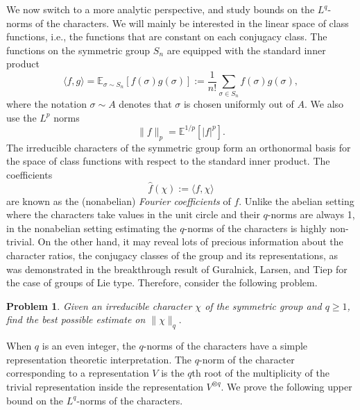 \documentclass[11pt, letterpaper]{amsart}
\newtheorem{problem}[thm]{Problem}
\newcommand{\remove}[1]{}
\renewcommand\ge{\geqslant}
\begin{document}
We now switch to a more analytic perspective, and study bounds on the $L^q$-norms of the characters. We will mainly be interested in the linear space of class functions, i.e., the functions that are constant on each conjugacy class. The functions on the symmetric group $S_n$ are equipped with the standard inner product 
\[\langle f, g \rangle =\mathbb{E}_{\sigma\sim S_n}[f(\sigma)g(\sigma)] := \frac{1}{n!}\sum_{\sigma \in S_n}f(\sigma)g(\sigma),\]
where the notation $\sigma \sim A$ denotes that $\sigma$ is chosen uniformly out of $A$.
We also use the $L^p$ norms 
\[\|f\|_p = \mathbb{E}^{1/p}[|f|^p].\]
The irreducible characters of the symmetric group form an orthonormal basis for the space of class functions with respect to the standard inner product. 
The coefficients 
\[
\hat{f}(\chi):= \langle f, \chi \rangle
\]
are known as the (nonabelian) \emph{Fourier coefficients} of $f$. Unlike the abelian setting where the characters take values in the unit circle and their $q$-norms are always 1, in the nonabelian setting estimating the $q$-norms of the characters is highly non-trivial. On the other hand, it may reveal lots of precious information about the character ratios, the conjugacy classes of the group and its representations, as was demonstrated in the breakthrough result of Guralnick, Larsen, and Tiep \cite{guralnick2020character} for the case of groups of Lie type. Therefore, consider the following problem.

\begin{problem}
Given an irreducible character $\chi$ of the symmetric group and $q\ge 1$, find the best possible estimate on $\|\chi\|_q.$
\end{problem}

  When $q$ is an even integer, the $q$-norms of the characters have a simple representation theoretic interpretation. The $q$-norm of the character corresponding to a representation $V$ is the $q$th root of the multiplicity of the trivial representation inside the representation $V^{\otimes q}$. \remove{While this representation theoretic information can definitely be of use\footnote{It can be used to deduce that if $\pi_1$ is a sub-representation of $\pi_2,$ then the $q$-norm of the trace of $\pi_1$ is at most the $q$-norm of the trace of $\pi_2$.}, it turns out that the problem of decomposing tensor products into irreducible characters is notoriously difficult.} We prove the following upper bound on the $L^q$-norms of the characters. 
\end{document}
